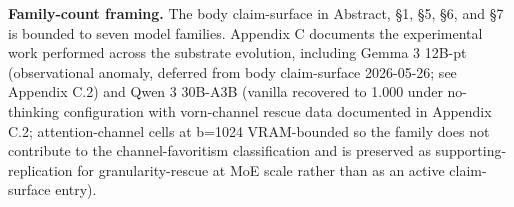 \documentclass[10pt]{article}
\begin{document}
\textbf{Family-count framing.} The body claim-surface in Abstract, \S1,
\S5, \S6, and \S7 is bounded to seven model families. Appendix C
documents the experimental work performed across the substrate
evolution, including Gemma 3 12B-pt
(observational anomaly, deferred from body claim-surface 2026-05-26;
see Appendix C.2) and Qwen 3 30B-A3B (vanilla recovered to 1.000 under
no-thinking configuration with vorn-channel rescue data documented in
Appendix C.2; attention-channel cells at b=1024 VRAM-bounded so the
family does not contribute to the channel-favoritism classification
and is preserved as supporting-replication for granularity-rescue at
MoE scale rather than as an active claim-surface entry).
\end{document}
